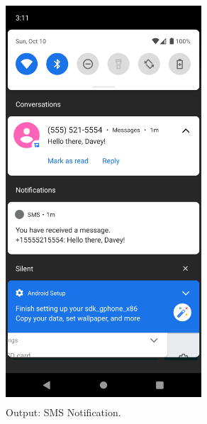 \documentclass[12pt, a4]{article}
\begin{document}
\subsection*{}
\begin{figure}[h]
\centering
\caption{Output: SMS Notification.}
\includegraphics[height=15cm, width=7.3cm]{SMS/Screenshots/Output-3.png}
\end{figure}


\newpage
\end{document}

